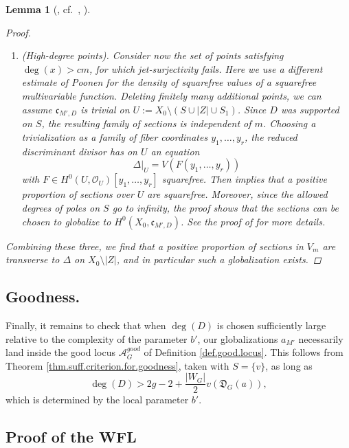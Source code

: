 \documentclass[openany]{amsbook}
\newtheorem{lemma}[theorem]{Lemma}
\theoremstyle{definition}
\theoremstyle{remark}
\numberwithin{equation}{section}
\renewcommand{\O}{\mathcal{O}}
\newcommand{\cA}{\mathcal{A}}
\renewcommand{\-}{\operatorname{-}}
\newcommand{\good}{\mathit{good}}
\newcommand{\fc}{\mathfrak{c}}
\newcommand{\fD}{\mathfrak{D}}
\begin{document}
\begin{lemma}[{\cite[Proposition 5.1.1]{ngoetal}, cf.\ \cite[Theorem 1.2]{poonenbertini}, \cite[Theorem 8.1]{poonensquarefree}}]
\begin{proof}
\begin{enumerate}
            \item (High-degree points). Consider now the set of points satisfying $\deg(x) > cm$, for which jet-surjectivity fails. Here we use a different estimate of Poonen for the density of squarefree values of a squarefree multivariable function. Deleting finitely many additional points, we can assume $\fc_{M',D}$ is trivial on $U := X_0 \setminus (S \cup |Z| \cup S_1)$. Since $D$ was supported on $S$, the resulting family of sections is independent of $m$. Choosing a trivialization as a family of fiber coordinates $y_1, \ldots, y_r$, the reduced discriminant divisor has on $U$ an equation
            $$
                \Delta|_U = V(F(y_1,\ldots, y_r))
            $$
            with $F \in H^0(U, \O_U)[y_1,\ldots, y_r]$ squarefree. Then \cite[Theorem 8.1]{poonensquarefree} implies that a positive proportion of sections over $U$ are squarefree. Moreover, since the allowed degrees of poles on $S$ go to infinity, the proof shows that the sections can be chosen to globalize to $H^0(X_0, \fc_{M',D})$. See the proof of \cite[Proposition 5.1.1]{ngoetal} for more details. 
        \end{enumerate}
        Combining these three, we find that a positive proportion of sections in $V_m$ are transverse to $\Delta$ on $X_0 \setminus |Z|$, and in particular such a globalization exists.
    \end{proof}
\end{lemma}


\subsection{Goodness.}


Finally, it remains to check that when $\deg(D)$ is chosen sufficiently large relative to the complexity of the parameter $b'$, our globalizations $a_{M'}$ necessarily land inside the good locus $\cA_G^{\good}$ of Definition \ref{def.good.locus}. This follows from Theorem \ref{thm.suff.criterion.for.goodness}, taken with $S = \{v\}$, as long as 
$$
    \deg(D) > 2g - 2 + \frac{|W_G|}{2} v(\fD_G(a)),
$$
which is determined by the local parameter $b'$.


\subsection{Proof of the WFL}
\end{document}
